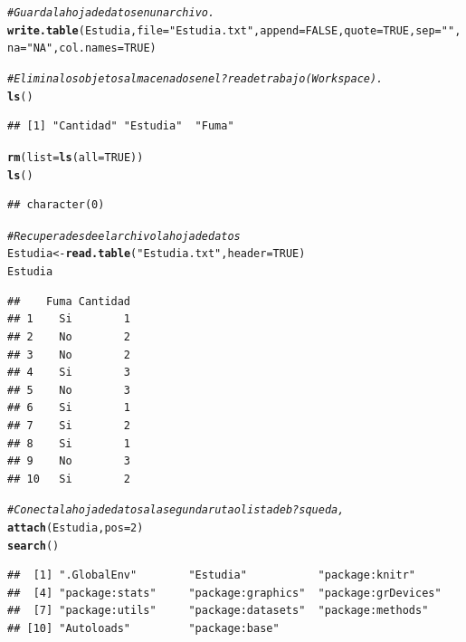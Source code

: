 \documentclass[10pt,a4paper]{article}\usepackage[]{graphicx}\usepackage[]{color}
\makeatletter
\newcommand{\hlnum}[1]{\textcolor[rgb]{0.686,0.059,0.569}{#1}}%
\newcommand{\hlstr}[1]{\textcolor[rgb]{0.192,0.494,0.8}{#1}}%
\newcommand{\hlcom}[1]{\textcolor[rgb]{0.678,0.584,0.686}{\textit{#1}}}%
\newcommand{\hlstd}[1]{\textcolor[rgb]{0.345,0.345,0.345}{#1}}%
\newcommand{\hlkwb}[1]{\textcolor[rgb]{0.69,0.353,0.396}{#1}}%
\newcommand{\hlkwc}[1]{\textcolor[rgb]{0.333,0.667,0.333}{#1}}%
\newcommand{\hlkwd}[1]{\textcolor[rgb]{0.737,0.353,0.396}{\textbf{#1}}}%
\newenvironment{kframe}{%
 \def\at@end@of@kframe{}%
 \ifinner\ifhmode%
  \def\at@end@of@kframe{\end{minipage}}%
  \begin{minipage}{\columnwidth}%
 \fi\fi%
 \def\FrameCommand##1{\hskip\@totalleftmargin \hskip-\fboxsep
 \colorbox{shadecolor}{##1}\hskip-\fboxsep
     \hskip-\linewidth \hskip-\@totalleftmargin \hskip\columnwidth}%
 \MakeFramed {\advance\hsize-\width
   \@totalleftmargin\z@ \linewidth\hsize
   \@setminipage}}%
 {\par\unskip\endMakeFramed%
 \at@end@of@kframe}
\newenvironment{knitrout}{}{} %
\makeatother
\begin{document}
\begin{knitrout}
\begin{kframe}
\begin{alltt}
\hlcom{#Guarda la hoja de datos en un archivo. }
\hlkwd{write.table}\hlstd{(Estudia,} \hlkwc{file}\hlstd{=}\hlstr{"Estudia.txt"}\hlstd{,} \hlkwc{append}\hlstd{=}\hlnum{FALSE}\hlstd{,} \hlkwc{quote}\hlstd{=}\hlnum{TRUE}\hlstd{,} \hlkwc{sep}\hlstd{=}\hlstr{" "}\hlstd{,} \hlkwc{na}\hlstd{=}\hlstr{"NA"}\hlstd{,}\hlkwc{col.names}\hlstd{=}\hlnum{TRUE}\hlstd{)}


\hlcom{#Elimina los objetos almacenados enel ?rea de trabajo (Workspace). }
\hlkwd{ls}\hlstd{()}
\end{alltt}
\begin{verbatim}
## [1] "Cantidad" "Estudia"  "Fuma"
\end{verbatim}
\begin{alltt}
\hlkwd{rm}\hlstd{(}\hlkwc{list}\hlstd{=}\hlkwd{ls}\hlstd{(}\hlkwc{all}\hlstd{=}\hlnum{TRUE}\hlstd{))}
\hlkwd{ls}\hlstd{()}
\end{alltt}
\begin{verbatim}
## character(0)
\end{verbatim}
\begin{alltt}
\hlcom{#Recupera desde el archivo la hoja de datos}
\hlstd{Estudia} \hlkwb{<-} \hlkwd{read.table}\hlstd{(}\hlstr{"Estudia.txt"}\hlstd{,} \hlkwc{header}\hlstd{=}\hlnum{TRUE}\hlstd{)}
\hlstd{Estudia}
\end{alltt}
\begin{verbatim}
##    Fuma Cantidad
## 1    Si        1
## 2    No        2
## 3    No        2
## 4    Si        3
## 5    No        3
## 6    Si        1
## 7    Si        2
## 8    Si        1
## 9    No        3
## 10   Si        2
\end{verbatim}
\begin{alltt}
\hlcom{#Conecta la hoja de datos a la segunda ruta o lista de b?squeda, }
\hlkwd{attach}\hlstd{(Estudia,} \hlkwc{pos}\hlstd{=}\hlnum{2}\hlstd{)}
\hlkwd{search}\hlstd{()}
\end{alltt}
\begin{verbatim}
##  [1] ".GlobalEnv"        "Estudia"           "package:knitr"    
##  [4] "package:stats"     "package:graphics"  "package:grDevices"
##  [7] "package:utils"     "package:datasets"  "package:methods"  
## [10] "Autoloads"         "package:base"
\end{verbatim}
\end{kframe}
\end{knitrout}
\end{document}
